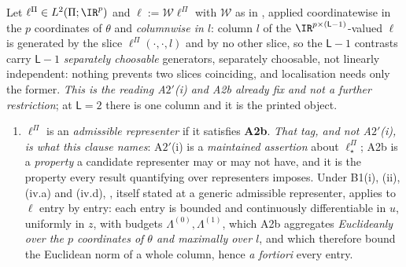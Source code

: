 \begin{definition}\label{def:weight}
Let $\ell^\Pi\in L^{2}(\Pi;\IR^{p})$ and $\ell:=\mathcal W\ell^\Pi$ with $\mathcal W$ as in
, applied coordinatewise in the $p$ coordinates of $\theta$ and \emph{columnwise in $l$}:
column $l$ of the $\IR^{p\times(\mathsf L-1)}$-valued $\ell$ is generated by the slice
$\ell^\Pi(\cdot,\cdot,l)$ and by no other slice, so the $\mathsf L-1$ contrasts carry $\mathsf L-1$
\emph{separately choosable} generators, separately choosable, not linearly
independent: nothing prevents two slices coinciding, and localisation needs only
the former. \emph{This is the reading A$2'$(i) and A2b already fix and not a further
restriction}; at $\mathsf L=2$ there is one column and it is the printed object.
\begin{enumerate}
\item[(a)] $\ell^\Pi$ is an \emph{admissible representer} if it satisfies \textbf{A2b}. \emph{That tag,
and not A$2'$(i), is what this clause names}: A$2'$(i) is a \emph{maintained assertion} about
$\ell^\Pi_\star$; A2b is a \emph{property} a candidate representer may or may not have, and it is the
property every result quantifying over representers imposes. Under B1(i), (ii), (iv.a) and (iv.d),
, itself stated at a generic admissible representer, applies to $\ell$
entry by entry: each entry is
bounded and continuously differentiable in $u$, uniformly in $z$, with budgets
$\Lambda^{(0)},\Lambda^{(1)}$, which A2b aggregates \emph{Euclidean\/ly over the $p$ coordinates of
$\theta$ and maximally over $l$}, and which therefore bound the Euclidean norm of a whole column, 
hence \emph{a fortiori} every entry.
%

\end{enumerate}
\end{definition}
